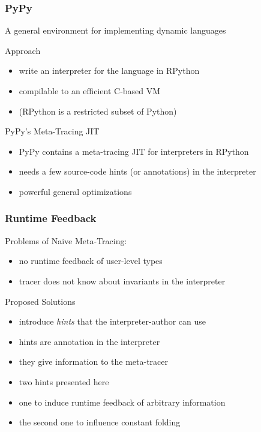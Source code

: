 \documentclass[utf8x]{beamer}
\begin{document}
\begin{frame}
  \frametitle{PyPy}
  A general environment for implementing dynamic languages
  \pause
  \begin{block}{Approach}
      \begin{itemize}
          \item write an interpreter for the language in RPython
          \item compilable to an efficient C-based VM
          \pause
          \item (RPython is a restricted subset of Python)
      \end{itemize}
  \end{block}
  \pause
  \begin{block}{PyPy's Meta-Tracing JIT}
      \begin{itemize}
          \item PyPy contains a meta-tracing JIT for interpreters in RPython
          \item needs a few source-code hints (or annotations) in the interpreter
          \item powerful general optimizations
      \end{itemize}
  \end{block}
\end{frame}

\begin{frame}
  \frametitle{Runtime Feedback}
  Problems of Naive Meta-Tracing:
  \begin{itemize}
      \item no runtime feedback of user-level types
      \item tracer does not know about invariants in the interpreter
  \end{itemize}
  \pause
  \begin{block}{Proposed Solutions}
      \begin{itemize}
          \item introduce \textit{hints} that the interpreter-author can use
          \item hints are annotation in the interpreter
          \item they give information to the meta-tracer
          \pause
          \item two hints presented here
          \item one to induce runtime feedback of arbitrary information
          \item the second one to influence constant folding
      \end{itemize}
  \end{block}
\end{frame}
\end{document}
